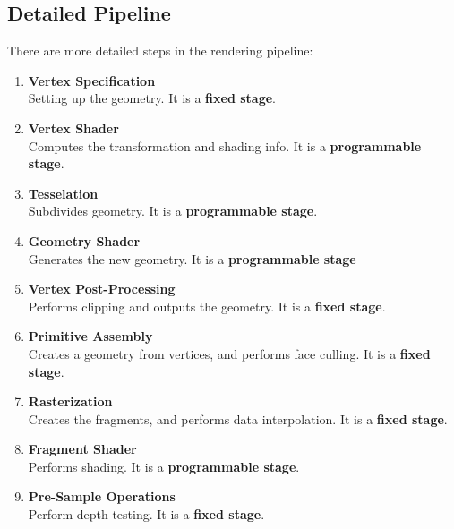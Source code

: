 \documentclass{article}
\begin{document}
\subsection{Detailed Pipeline}
There are more detailed steps in the rendering pipeline:

\begin{enumerate}
	\item \textbf{Vertex Specification}
	\vspace{.2cm} \\
	Setting up the geometry. It is a \textbf{fixed stage}.
	
	\item \textbf{Vertex Shader}
	\vspace{.2cm} \\
	Computes the transformation and shading info. It is a \textbf{programmable stage}.
	
	\item \textbf{Tesselation}
	\vspace{.2cm} \\
	Subdivides geometry. It is a \textbf{programmable stage}.
	
	\item \textbf{Geometry Shader}
	\vspace{.2cm} \\
	Generates the new geometry. It is a \textbf{programmable stage}
	
	\item \textbf{Vertex Post-Processing}
	\vspace{.2cm} \\
	Performs clipping and outputs the geometry. It is a \textbf{fixed stage}.
	
	\item \textbf{Primitive Assembly}
	\vspace{.2cm} \\
	Creates a geometry from vertices, and performs face culling. It is a \textbf{fixed stage}.
	
	\item \textbf{Rasterization}
	\vspace{.2cm} \\
	Creates the fragments, and performs data interpolation. It is a \textbf{fixed stage}.
	
	\item \textbf{Fragment Shader}
	\vspace{.2cm} \\
	Performs shading. It is a \textbf{programmable stage}.
	
	\item \textbf{Pre-Sample Operations}
	\vspace{.2cm} \\
	Perform depth testing. It is a \textbf{fixed stage}.
\end{enumerate}
\end{document}
